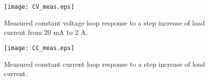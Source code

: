 \documentclass[a4paper,10pt, oneside]{article}
\begin{document}
\begin{figure}[H]
	\begin{centering}	
		\texttt{[image: CV\_meas.eps]}
		\caption{Measured constant voltage loop response to a step increase of load current from 20 mA to 2 A. }\label{CV_meas.eps}
	\end{centering}	
\end{figure}
\begin{figure}[H]
	\begin{centering}	
		\texttt{[image: CC\_meas.eps]}
		\caption{Measured constant current loop response to a step increase of load current.}\label{CC_meas.eps}
	\end{centering}	
\end{figure}
\end{document}
